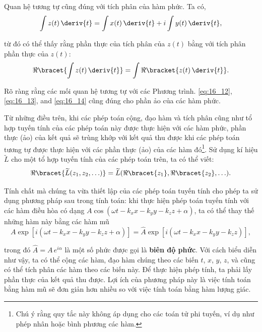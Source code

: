 Quan hệ tương tự cũng đúng với tích phân của hàm phức.
Ta có,
\begin{equation*}
    \int z(t)\, \deriv{t} = \int x(t)\, \deriv{t} + i \int y(t)\, \deriv{t},
\end{equation*}

\noindent
từ đó có thể thấy rằng phần thực của tích phân của $z(t)$ bằng với tích phân phần thực của $z(t)$:
\begin{equation}\label{eq:16_14}
    \Re\bracet{\int z(t)\, \deriv{t}} = \int \Re\bracket{z(t)\, \deriv{t}}.
\end{equation}

Rõ ràng rằng các mối quan hệ tương tự với các Phương trình. \eqref{eq:16_12}, \eqref{eq:16_13}, and \eqref{eq:16_14} cũng đúng cho phần ảo của các hàm phức.

Từ những điều trên, khi các phép toán cộng, đạo hàm và tích phân cũng như tổ hợp tuyến tính của các phép toán này được thực hiện với các hàm phức, phần thực (ảo) của kết quả sẽ trùng khớp với kết quả thu được khi các phép toán tương tự được thực hiện với các phần thực (ảo) của các hàm đó\footnote{Chú ý rằng quy tắc này không áp dụng cho các toán tử phi tuyến, ví dụ như phép nhân hoặc bình phương các hàm.}.
Sử dụng kí hiệu $\widetilde{L}$ cho một tổ hợp tuyến tính của các phép toán trên, ta có thể viết:
\begin{equation}\label{eq:16_15}
    \Re\bracet{\widetilde{L}(z_1, z_2, \ldots)} = \widetilde{L}(\Re\bracet{z_1}, \Re\bracet{z_2}, \ldots).
\end{equation}

Tính chất mà chúng ta vừa thiết lập của các phép toán tuyến tính cho phép ta sử dụng phương pháp sau trong tính toán: khi thực hiện phép toán tuyến tính với các hàm điều hòa có dạng $A \cos(\omega t - k_x x - k_y y - k_z z + \alpha)$, ta có thể thay thế những hàm này bằng các hàm mũ
\begin{equation}\label{eq:16_16}
    A \exp[i (\omega t - k_x x - k_y y - k_z z + \alpha)] = \hat{A} \exp[i (\omega t - k_x x - k_y y - k_z z)],
\end{equation}

\noindent
trong đó $\hat{A} = A\,e^{i\alpha}$ là một số phức được gọi là \textbf{biên độ phức}.
Với cách biểu diễn như vậy, ta có thể cộng các hàm, đạo hàm chúng theo các biến $t$, $x$, $y$, $z$, và cũng có thể tích phân các hàm theo các biến này.
Để thực hiện phép tính, ta phải lấy phần thực của kết quả thu được.
Lợi ích của phương pháp này là việc tính toán bằng hàm mũ sẽ đơn giản hơn nhiều so với việc tính toán bằng hàm lượng giác.

